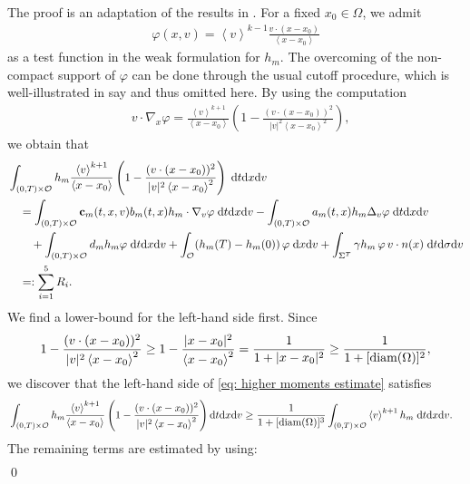 \documentclass[10pt, reqno]{amsart}
\theoremstyle{plain}
\theoremstyle{definition}
\theoremstyle{remark}
\renewenvironment{proof}[1][\proofname]{\noindent{\scshape #1.\quad}}{\qed}
\numberwithin{equation}{section}
\newcommand{\bfc}{{\bf c}}
\newcommand{\calO}{\mathcal O}
\newcommand{\dx}{\textnormal{d}x}
\newcommand{\dv}{\textnormal{d}v}
\newcommand{\dt}{\textnormal{d}t}
\newcommand{\tnd}{\textnormal{d}}
\newcommand{\lt}{\left}
\newcommand{\rt}{\right}
\begin{document}
\begin{proof}
The proof is an adaptation of the results in \cite{Perthame1992}. For a fixed $x_0\in \Omega$, we admit
\begin{align*}
    \varphi(x,v) = \lt<v\rt>^{k-1} \frac{v\cdot (x-x_0)}{\lt<x-x_0\rt>}
\end{align*}
as a test function in the weak formulation for $h_m$. The overcoming of the non-compact support of $\varphi$ can be done through the usual cutoff procedure, which is well-illustrated in say \cite[Lemma 2.2]{ChenZhang2016} and thus omitted here. By using the computation
\begin{align*}
    &v\cdot \nabla_x\varphi = \frac{\lt<v\rt>^{k+1}}{\lt<x-x_0\rt>} \left(1 - \frac{(v\cdot (x-x_0))^2}{|v|^2\lt<x-x_0\rt>^2}\right),
\end{align*}
we obtain that
\begin{equation}\label{eq: higher moments estimate}
\begin{split}
    &\int_{(0,T)\times \calO} h_m \frac{\lt<v\rt>^{k+1}}{\lt<x-x_0\rt>} \left(1 - \frac{(v\cdot (x-x_0))^2}{|v|^2 \lt<x-x_0\rt>^2} \right) \;\dt\dx\dv \\
    &\quad= \int_{(0,T)\times \calO} \bfc_m(t,x,v) b_m(t,x) h_m \cdot \nabla_v \varphi \;\dt\dx\dv - \int_{(0,T)\times\calO} a_m(t,x) h_m \Delta_v\varphi \;\dt\dx\dv \\
    &\qquad + \int_{(0,T)\times \calO} d_m h_m \varphi \;\dt\dx\dv + \int_{\calO} (h_m(T) - h_m(0)) \,\varphi \;\dx\dv + \int_{\Sigma^T} \gamma h_m \, \varphi \, v\cdot n(x) \;\dt\tnd\sigma\dv \cr
    &\quad=: \sum_{i=1}^5 R_i.
\end{split}
\end{equation}
We find a lower-bound for the left-hand side first. Since
\begin{align*}
    1 - \frac{(v\cdot (x-x_0))^2}{|v|^2 \lt<x-x_0\rt>^2} \ge 1 - \frac{|x-x_0|^2}{\lt<x-x_0\rt>^2} = \frac{1}{1+|x-x_0|^2} \ge \frac{1}{1 + [\textnormal{diam}(\Omega)]^2 },
\end{align*}
we discover that the left-hand side of \eqref{eq: higher moments estimate} satisfies
\begin{align*}
    &\int_{(0,T)\times\calO} h_m \frac{\lt<v\rt>^{k+1}}{\lt<x-x_0\rt>} \left(1 - \frac{(v\cdot (x-x_0))^2}{|v|^2 \lt<x-x_0\rt>^2} \right) \dt\dx\dv  \ge \frac{1}{1+[\textnormal{diam}(\Omega)]^3} \int_{(0,T)\times\calO} \lt<v\rt>^{k+1} h_m \;\dt\dx\dv.
\end{align*}
The remaining terms are estimated by using:
\begin{align*}

\end{align*}
\end{proof}
\end{document}
